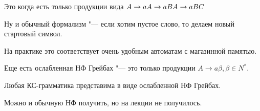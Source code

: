Это когда есть только продукции вида $\\
A \to a \\
A \to aB \\
A \to aBC$

Ну и обычный формализм "--- если хотим пустое слово, то делаем новый стартовый символ.

На практике это соответствует очень удобным автоматам с магазинной памятью.

Еще есть ослабленная НФ Грейбах "--- это только продукции $A \to a \beta, \beta \in N^*$.

\begin{theorem}
Любая КС-грамматика представима в виде ослабленной НФ Грейбах.
\end{theorem} 
\begin{Rem}
Можно и обычную НФ получить, но на лекции не получилось.
\end{Rem}

